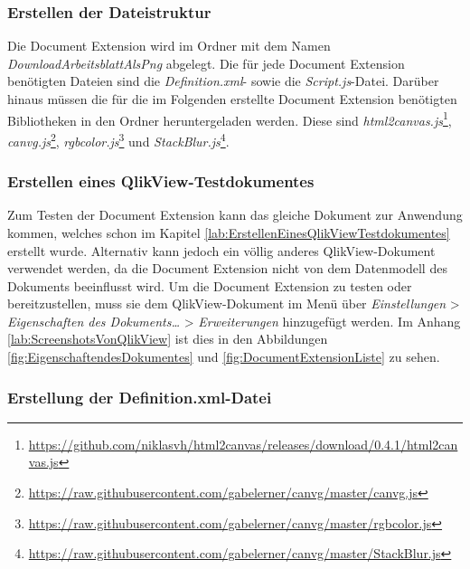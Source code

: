 \subsubsection{Erstellen der Dateistruktur}


Die Document Extension wird im Ordner mit dem Namen \textit{DownloadArbeitsblattAlsPng} abgelegt. Die für jede Document Extension benötigten Dateien sind die \textit{Definition.xml}- sowie die \textit{Script.js}-Datei. Darüber hinaus müssen die für die im Folgenden erstellte Document Extension benötigten Bibliotheken in den Ordner heruntergeladen werden. Diese sind \textit{html2canvas.js}\footnote{\url{https://github.com/niklasvh/html2canvas/releases/download/0.4.1/html2canvas.js}}, \textit{canvg.js}\footnote{\url{https://raw.githubusercontent.com/gabelerner/canvg/master/canvg.js}}, \textit{rgbcolor.js}\footnote{\url{https://raw.githubusercontent.com/gabelerner/canvg/master/rgbcolor.js}} und \textit{StackBlur.js}\footnote{\url{https://raw.githubusercontent.com/gabelerner/canvg/master/StackBlur.js}}.










\newpage
\subsubsection{Erstellen eines QlikView-Testdokumentes}

Zum Testen der Document Extension kann das gleiche Dokument zur Anwendung kommen, welches schon im Kapitel \ref{lab:ErstellenEinesQlikViewTestdokumentes} erstellt wurde. Alternativ kann jedoch ein völlig anderes QlikView-Dokument verwendet werden, da die Document Extension nicht von dem Daten\-modell des Dokuments beeinflusst wird. Um die Document Extension zu testen oder bereitzustellen, muss sie dem QlikView-Dokument im Menü über \textit{Einstellungen} > \textit{Eigenschaften des Dokuments…} > \textit{Erweiterungen} hinzugefügt werden. Im Anhang \ref{lab:ScreenshotsVonQlikView} ist dies in den Abbildungen \ref{fig:EigenschaftendesDokumentes} und \ref{fig:DocumentExtensionListe} zu sehen.



\subsubsection{Erstellung der Definition.xml-Datei}

